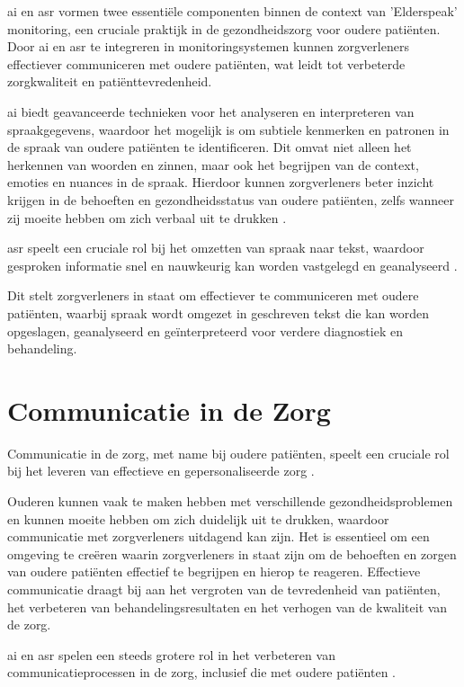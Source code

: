 \gls{ai} en \gls{asr} vormen twee essentiële componenten binnen de context van 'Elderspeak' monitoring, een cruciale praktijk in de gezondheidszorg voor oudere patiënten. Door \gls{ai} en \gls{asr} te integreren in monitoringsystemen kunnen zorgverleners effectiever communiceren met oudere patiënten, wat leidt tot verbeterde zorgkwaliteit en patiënttevredenheid.

\gls{ai} biedt geavanceerde technieken voor het analyseren en interpreteren van spraakgegevens, waardoor het mogelijk is om subtiele kenmerken en patronen in de spraak van oudere patiënten te identificeren. Dit omvat niet alleen het herkennen van woorden en zinnen, maar ook het begrijpen van de context, emoties en nuances in de spraak. Hierdoor kunnen zorgverleners beter inzicht krijgen in de behoeften en gezondheidsstatus van oudere patiënten, zelfs wanneer zij moeite hebben om zich verbaal uit te drukken \autocite{young2002,jabraf2019}.

\gls{asr} speelt een cruciale rol bij het omzetten van spraak naar tekst, waardoor gesproken informatie snel en nauwkeurig kan worden vastgelegd en geanalyseerd \autocite{rabiner1993fundamentals,jabraf2017}.

Dit stelt zorgverleners in staat om effectiever te communiceren met oudere patiënten, waarbij spraak wordt omgezet in geschreven tekst die kan worden opgeslagen, geanalyseerd en geïnterpreteerd voor verdere diagnostiek en behandeling.

\section{Communicatie in de Zorg}
Communicatie in de zorg, met name bij oudere patiënten, speelt een cruciale rol bij het leveren van effectieve en gepersonaliseerde zorg \autocite{smith2020}.

Ouderen kunnen vaak te maken hebben met verschillende gezondheidsproblemen en kunnen moeite hebben om zich duidelijk uit te drukken, waardoor communicatie met zorgverleners uitdagend kan zijn. Het is essentieel om een ​​omgeving te creëren waarin zorgverleners in staat zijn om de behoeften en zorgen van oudere patiënten effectief te begrijpen en hierop te reageren. Effectieve communicatie draagt bij aan het vergroten van de tevredenheid van patiënten, het verbeteren van behandelingsresultaten en het verhogen van de kwaliteit van de zorg.

\gls{ai} en \gls{asr} spelen een steeds grotere rol in het verbeteren van communicatieprocessen in de zorg, inclusief die met oudere patiënten \autocite{patel2019}. 

